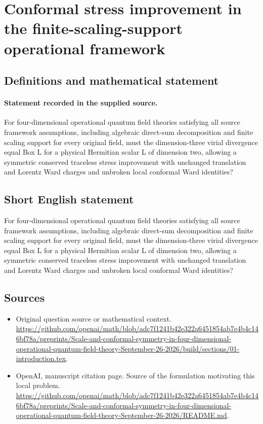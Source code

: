 \documentclass[11pt]{article}
\begin{document}
\section*{Conformal stress improvement in the finite-scaling-support operational framework}\label{statement}
\subsection{Definitions and mathematical statement}
\paragraph{Statement recorded in the supplied source.}
For four-dimensional operational quantum field theories satisfying all source framework assumptions, including algebraic direct-sum decomposition and finite scaling support for every original field, must the dimension-three virial divergence equal Box L for a physical Hermitian scalar L of dimension two, allowing a symmetric conserved traceless stress improvement with unchanged translation and Lorentz Ward charges and unbroken local conformal Ward identities?
\subsection{Short English statement}
For four-dimensional operational quantum field theories satisfying all source framework assumptions, including algebraic direct-sum decomposition and finite scaling support for every original field, must the dimension-three virial divergence equal Box L for a physical Hermitian scalar L of dimension two, allowing a symmetric conserved traceless stress improvement with unchanged translation and Lorentz Ward charges and unbroken local conformal Ward identities?
\subsection{Sources}
\begin{itemize}
\item[S1] Original question source or mathematical context.
\url{https://github.com/openai/math/blob/adc7f1241b42e322a6451854ab7e4b4c146bf78a/preprints/Scale-and-conformal-symmetry-in-four-dimensional-operational-quantum-field-theory-September-26-2026/build/sections/01-introduction.tex}.
\item[S2] OpenAI, manuscript citation page. Source of the formulation motivating this local problem.
\url{https://github.com/openai/math/blob/adc7f1241b42e322a6451854ab7e4b4c146bf78a/preprints/Scale-and-conformal-symmetry-in-four-dimensional-operational-quantum-field-theory-September-26-2026/README.md}.
\end{itemize}
\end{document}
